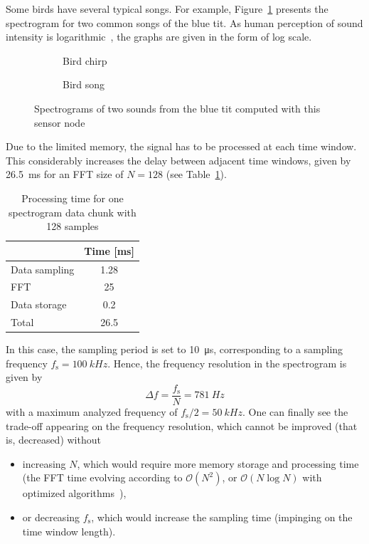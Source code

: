 \documentclass{EPL-master-thesis-covers-EN}
\newcommand{\te}[1]{\textrm{#1}}
\begin{document}
Some birds have several typical songs. For example, Figure~\ref{fig:blue_tit} presents the spectrogram for two common songs of the blue tit. As human perception of sound intensity is logarithmic~\cite{Psychoacoustics}, the graphs are given in the form of log scale.

\begin{figure}[H]
\begin{subfigure}{.48\textwidth}
  \centering
  
  \caption{Bird chirp}
\end{subfigure}
\begin{subfigure}{.48\textwidth}
  \centering
  
  \caption{Bird song}
\end{subfigure}
\caption{Spectrograms of two sounds from the blue tit computed with this sensor node}
\label{fig:blue_tit}
\end{figure}

Due to the limited memory, the signal has to be processed at each time window. This considerably increases the delay between adjacent time windows, given by \SI{26.5}{ms} for an FFT size of $N = 128$ (see Table~\ref{tab:spec_data_proc}).

\begin{table}[H]
\centering
\begin{tabular}{lc}
\toprule
                     & Time [\si{ms}] \\ \midrule
 Data sampling       & 1.28           \\
 FFT                 & 25             \\
 Data storage        & 0.2            \\ \midrule
 Total               & 26.5           \\ \bottomrule
\end{tabular}
\caption{Processing time for one spectrogram data chunk with 128 samples}
\label{tab:spec_data_proc}
\end{table}

In this case, the sampling period is set to \SI{10}{\micro s}, corresponding to a sampling frequency $f_\te{s} = \SI{100}{kHz}$. Hence, the frequency resolution in the spectrogram is given by
\[
 \Delta f = \frac{f_\te{s}}{N} = \SI{781}{Hz}
\]
with a maximum analyzed frequency of $f_\te{s}/2 = \SI{50}{kHz}$. One can finally see the trade-off appearing on the frequency resolution, which cannot be improved (that is, decreased) without 
\begin{itemize}
 \item increasing $N$, which would require more memory storage and processing time (the FFT time evolving according to $\mathcal{O}(N^2)$, or $\mathcal{O}(N \log N)$ with optimized algorithms~\cite{QIU1999159}),
 \item or decreasing $f_\te{s}$, which would increase the sampling time (impinging on the time window length).
\end{itemize}
\end{document}
